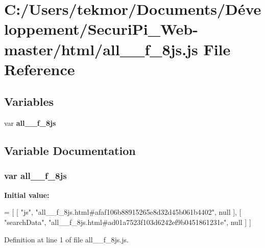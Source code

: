 \section{C\+:/\+Users/tekmor/\+Documents/\+Développement/\+Securi\+Pi\+\_\+\+Web-\/master/html/all\+\_\+\+\_\+f\+\_\+8js.js File Reference}
\label{all____f__8js_8js}
\subsection*{Variables}
\begin{DoxyCompactItemize}
\item 
var {\bf all\+\_\+\+\_\+f\+\_\+8js}
\end{DoxyCompactItemize}


\subsection{Variable Documentation}
\subsubsection[{all\+\_\+\+\_\+f\+\_\+8js}]{\setlength{\rightskip}{0pt plus 5cm}var all\+\_\+\+\_\+f\+\_\+8js}\label{all____f__8js_8js_af469a8ab1c2d6e4ac09cdc3826e2842e}
{\bfseries Initial value\+:}
\begin{DoxyCode}
=
[
    [ \textcolor{stringliteral}{"js"}, \textcolor{stringliteral}{"all\_\_f\_8js.html#afaf106b88915265e8d32d45b061b4402"}, null ],
    [ \textcolor{stringliteral}{"searchData"}, \textcolor{stringliteral}{"all\_\_f\_8js.html#ad01a7523f103d6242ef9b0451861231e"}, null ]
]
\end{DoxyCode}


Definition at line 1 of file all\+\_\+\+\_\+f\+\_\+8js.\+js.

